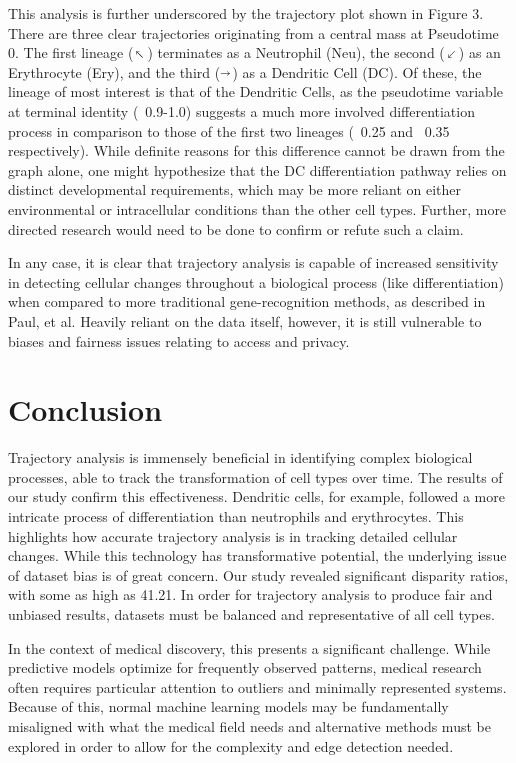 \documentclass{article}
\makeatletter
\newcommand{\fixed@sra}{$\vrule height 2\fontdimen22\textfont2 width 0pt\shortrightarrow$}
\newcommand{\shortarrow}[1]{%
  \mathrel{\text{\rotatebox[origin=c]{\numexpr#1*45}{\fixed@sra}}}%
}
\makeatother
\begin{document}
This analysis is further underscored by the trajectory plot shown in Figure 3. There are three clear trajectories originating from a central mass at Pseudotime 0. The first lineage ($\shortarrow{3}$) terminates as a Neutrophil (Neu), the second ($\shortarrow{5}$) as an Erythrocyte (Ery), and the third ($\shortarrow{0}$) as a Dendritic Cell (DC). Of these, the lineage of most interest is that of the Dendritic Cells, as the pseudotime variable at terminal identity (~0.9-1.0) suggests a much more involved differentiation process in comparison to those of the first two lineages (~0.25 and ~0.35 respectively). While definite reasons for this difference cannot be drawn from the graph alone, one might hypothesize that the DC differentiation pathway relies on distinct developmental requirements, which may be more reliant on either environmental or intracellular conditions than the other cell types. Further, more directed research would need to be done to confirm or refute such a claim.

In any case, it is clear that trajectory analysis is capable of increased sensitivity in detecting cellular changes throughout a biological process (like differentiation) when compared to more traditional gene-recognition methods, as described in Paul, et al. Heavily reliant on the data itself, however, it is still vulnerable to biases and fairness issues relating to access and privacy.


\section{Conclusion}
Trajectory analysis is immensely beneficial in identifying complex biological processes, able to track the transformation of cell types over time.  The results of our study confirm this effectiveness.  Dendritic cells, for example, followed a more intricate process of differentiation than neutrophils and erythrocytes.  This highlights how accurate trajectory analysis is in tracking detailed cellular changes.  While this technology has transformative potential, the underlying issue of dataset bias is of great concern.  Our study revealed significant disparity ratios, with some as high as 41.21.  In order for trajectory analysis to produce fair and unbiased results, datasets must be balanced and representative of all cell types.

In the context of medical discovery, this presents a significant challenge. While predictive models optimize for frequently observed patterns, medical research often requires particular attention to outliers and minimally represented systems. Because of this, normal machine learning models may be fundamentally misaligned with what the medical field needs and alternative methods must be explored in order to allow for the complexity and edge detection needed.
\end{document}
